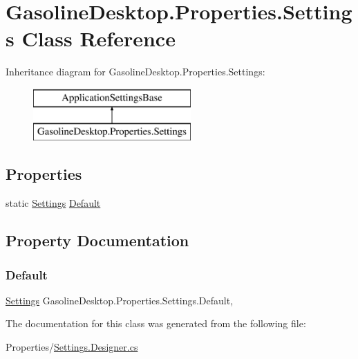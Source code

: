 \hypertarget{class_gasoline_desktop_1_1_properties_1_1_settings}{}\section{Gasoline\+Desktop.\+Properties.\+Settings Class Reference}
\label{class_gasoline_desktop_1_1_properties_1_1_settings}
Inheritance diagram for Gasoline\+Desktop.\+Properties.\+Settings\+:\begin{figure}[H]
\begin{center}
\leavevmode
\includegraphics[height=2.000000cm]{class_gasoline_desktop_1_1_properties_1_1_settings}
\end{center}
\end{figure}
\subsection*{Properties}
\begin{DoxyCompactItemize}
\item 
static \mbox{\hyperlink{class_gasoline_desktop_1_1_properties_1_1_settings}{Settings}} \mbox{\hyperlink{class_gasoline_desktop_1_1_properties_1_1_settings_a2328f2831ee6cc9610222abd04309995}{Default}}
\end{DoxyCompactItemize}


\subsection{Property Documentation}
\mbox{\label{class_gasoline_desktop_1_1_properties_1_1_settings_a2328f2831ee6cc9610222abd04309995}} 
\subsubsection{\texorpdfstring{Default}{Default}}
{\footnotesize\ttfamily \mbox{\hyperlink{class_gasoline_desktop_1_1_properties_1_1_settings}{Settings}} Gasoline\+Desktop.\+Properties.\+Settings.\+Default\hspace{0.3cm}{\ttfamily [static]}, {\ttfamily [get]}}



The documentation for this class was generated from the following file\+:\begin{DoxyCompactItemize}
\item 
Properties/\mbox{\hyperlink{_settings_8_designer_8cs}{Settings.\+Designer.\+cs}}\end{DoxyCompactItemize}
